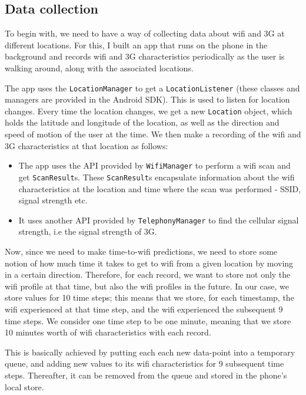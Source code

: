 \documentclass[12pt, fleqn]{article}
\begin{document}
\subsection{Data collection}
\label{time-to-wifi-data-collection}

To begin with, we need to have a way of collecting data about wifi and 3G at 
different locations. For this, I built an app that runs on the phone in the background and records 
wifi and 3G characteristics periodically as the user is walking around, along with 
the associated locations.

The app uses the \texttt{LocationManager} to get a \texttt{LocationListener} 
(these classes and managers are provided in the Android SDK).\cite{android-dev-guide}
This is used to listen for location changes. Every time the location changes, we 
get a new \texttt{Location} object, which holds the latitude and longitude of the location,
as well as the direction and speed of motion of the user at the time. We then
make a recording of the wifi and 3G characteristics at that location as 
follows:
\begin{itemize}
  \item The app uses the API provided by \texttt{WifiManager} to 
perform a wifi scan and get \texttt{ScanResult}s. These \texttt{ScanResult}s encapsulate information 
about the wifi characteristics at the location and time where the scan was 
performed - SSID, signal strength etc. 
  
  \item It uses another API provided by \texttt{TelephonyManager} to find the 
cellular signal strength, i.e the signal strength of 3G. 
\end{itemize}

Now, since we need to make time-to-wifi predictions, we need to store some 
notion of how much time it takes to get to wifi from a given location by moving 
in a certain direction. 
Therefore, for each record, we want to store not only the wifi profile at that time, but also 
the wifi profiles in the future. In our case, we store values for 10 time steps; 
this means that we store, for each timestamp, the 
wifi experienced at that time step, and the wifi experienced the subsequent 9
time steps. We consider one time step to be one minute, meaning that we store 10 
minutes worth of wifi characteristics with each record. 

This is basically achieved by putting each each new data-point into a temporary 
queue, and adding new values to its wifi characteristics for 9 subsequent time steps. 
Thereafter, it can be removed from the queue and stored in the phone's local store. 
\end{document}
